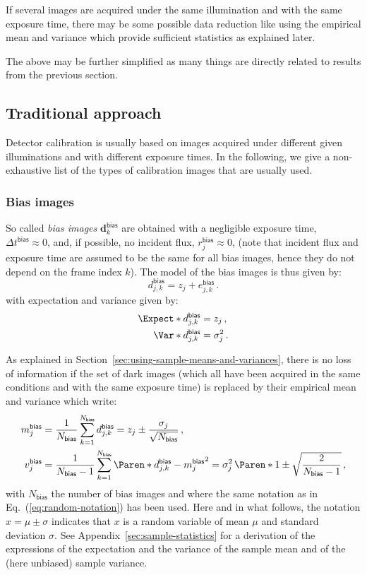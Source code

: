 \documentclass[a4paper,11pt,twoside]{scrartcl}
\newcommand{\oops}[1]{\textcolor[named]{BrickRed}{#1}}
\newcommand*{\Tag}[1]{\mathsf{#1}}
\newcommand*{\V}[1]{\boldsymbol{#1}}   %
\theoremstyle{plain} %
\theoremstyle{definition}
\theoremstyle{remark}
\begin{document}
\oops{If several images are acquired under the same illumination and with the
  same exposure time, there may be some possible data reduction like using the
  empirical mean and variance which provide sufficient statistics as explained
  later.}

\oops{The above may be further simplified as many things are directly related
to results from the previous section.}


\subsection{Traditional approach}

Detector calibration is usually based on images acquired under different given
illuminations and with different exposure times.  In the following, we give a
non-exhaustive list of the types of calibration images that are usually used.


\subsubsection{Bias images}

So called \emph{bias images} $\V d_k^\Tag{bias}$ are obtained with a
negligible exposure time, $\Delta t^\Tag{bias} \approx 0$, and, if possible, no
incident flux, $r_j^\Tag{bias} \approx 0$, (note that incident flux and
exposure time are assumed to be the same for all bias images, hence they do not
depend on the frame index $k$).  The model of the bias images is thus given
by:
\begin{equation}
  d_{j,k}^\Tag{bias} = z_j + e_{j,k}^\Tag{bias} \, .
  \label{eq:bias-model}
\end{equation}
with expectation and variance given by:
\begin{align}
  \Expect*{d_{j,k}^\Tag{bias}} &= z_j \, ,\\
  \Var*{d_{j,k}^\Tag{bias}}
  &= \sigma_j^2 \, .
\end{align}

As explained in Section~\ref{sec:using-sample-means-and-variances}, there is no
loss of information if the set of dark images (which all have been acquired in
the same conditions and with the same exposure time) is replaced by their
empirical mean and variance which write:
\begin{align}
  m_j^\Tag{bias}
  &= \frac{1}{N_\Tag{bias}} \sum_{k=1}^{N_\Tag{bias}}
  d_{j,k}^\Tag{bias}
  = z_j \pm \frac{\sigma_j}{\sqrt{N_\Tag{bias}}}\, ,
  \label{eq:avg-bias}\\
  v_j^\Tag{bias}
  &=  \frac{1}{N_\Tag{bias} - 1} \sum_{k=1}^{N_\Tag{bias}}
  \Paren*{d_{j,k}^\Tag{bias} - m_j^\Tag{bias}}^2
  = \sigma_j^2\,
  \Paren*{1 \pm \sqrt{\frac{2}{N_\Tag{bias} - 1}}} \, ,
  \label{eq:var-bias}
\end{align}
with $N_\Tag{bias}$ the number of bias images and where the same notation as in
Eq.~(\ref{eq:random-notation}) has been used.  Here and in what follows, the
notation $x = \mu \pm \sigma$ indicates that $x$ is a random variable of mean
$\mu$ and standard deviation $\sigma$.  See
Appendix~\ref{sec:sample-statistics} for a derivation of the expressions of the
expectation and the variance of the sample mean and of the (here unbiased)
sample variance.
\end{document}
